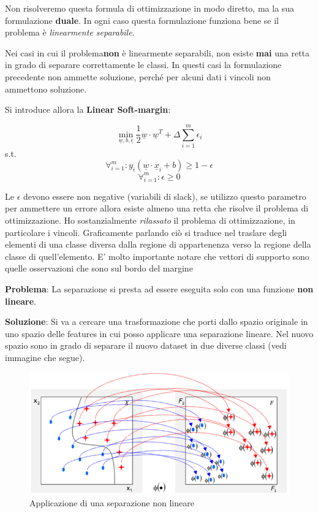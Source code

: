 Non risolveremo questa formula di ottimizzazione in modo diretto, ma la sua formulazione \textbf{duale}. In ogni caso questa formulazione funziona bene se il problema è  \textit{linearmente separabile}.

Nei casi in cui il problema\textbf{non} è linearmente separabili, non esiste \textbf{mai} una retta in grado di separare correttamente le classi. In questi casi la formulazione precedente non ammette soluzione, perché per alcuni dati i vincoli non ammettono soluzione. 

Si introduce allora la \textbf{Linear Soft-margin}:

\[ \min_{\underline{w},b,\underline{\epsilon}} \frac{1}{2}\underline{w} \cdot \underline{w}^T + \Delta \sum_{i=1}^{m} \epsilon_i \]
\qquad s.t.
\[\forall_{i=1}^m :  y_i (\underline{w} \cdot \underline{x}_i + b) \ge 1 - \epsilon \] \[\forall_{i=1}^m : \epsilon \ge 0\]

Le $\epsilon$ devono essere non negative (variabili di slack), se utilizzo questo parametro  per ammettere un errore allora esiste almeno una retta che risolve il problema di ottimizzazione. Ho sostanzialmente \textit{rilassato} il problema di ottimizzazione, in particolare i vincoli. Graficamente parlando ciò si traduce nel traslare degli elementi di una classe diversa dalla regione di appartenenza verso la regione della classe di quell'elemento.
E' molto importante notare che vettori di supporto sono quelle osservazioni che sono sul bordo del margine

\textbf{Problema}: La separazione si presta ad essere eseguita solo con una funzione \textbf{non lineare}.
 
\textbf{Soluzione}: Si va a cercare una trasformazione che porti dallo spazio originale in uno spazio delle features in cui posso applicare una separazione lineare. Nel nuovo spazio sono in grado di separare il nuovo dataset in due diverse classi (vedi immagine che segue). 

\begin{figure}[H]
	\centering
	\includegraphics[width=0.9 \linewidth]{classification/pict/svm_nonlinear.png}
	\caption{Applicazione di una separazione non lineare}
\end{figure}

